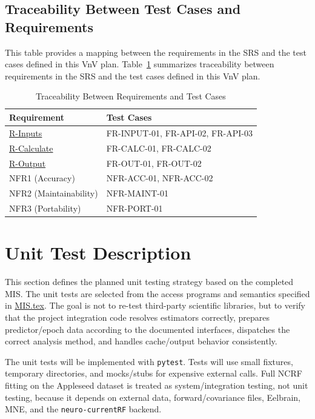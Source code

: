 \documentclass[12pt, titlepage]{article}
\begin{document}
\subsection{Traceability Between Test Cases and Requirements}

This table provides a mapping between the requirements in the SRS and the test cases defined in this VnV plan.
Table~\ref{tab:traceability} summarizes traceability between requirements in the
SRS and the test cases defined in this VnV plan.

\begin{table}[h!]
\centering
\begin{tabularx}{\textwidth}{p{} X}
\toprule
\textbf{Requirement} & \textbf{Test Cases} \\
\midrule
\hyperref[R-Inputs]{R-Inputs}  & FR-INPUT-01, FR-API-02, FR-API-03 \\
\hyperref[R-Calculate]{R-Calculate} & FR-CALC-01, FR-CALC-02 \\
\hyperref[R-Output]{R-Output} & FR-OUT-01, FR-OUT-02 \\
NFR1 (Accuracy) & NFR-ACC-01, NFR-ACC-02 \\
NFR2 (Maintainability) & NFR-MAINT-01 \\
NFR3 (Portability) & NFR-PORT-01 \\
\bottomrule
\end{tabularx}
\caption{Traceability Between Requirements and Test Cases}
\label{tab:traceability}
\end{table}


\section{Unit Test Description}

This section defines the planned unit testing strategy based on the completed MIS. The unit tests are selected from the access programs and semantics specified in \href{../Design/SoftDetailedDes/MIS.tex}{MIS.tex}. The goal is not to re-test third-party scientific libraries, but to verify that the project integration code resolves estimators correctly, prepares predictor/epoch data according to the documented interfaces, dispatches the correct analysis method, and handles cache/output behavior consistently.

The unit tests will be implemented with \texttt{pytest}. Tests will use small fixtures, temporary directories, and mocks/stubs for expensive external calls. Full NCRF fitting on the Appleseed dataset is treated as system/integration testing, not unit testing, because it depends on external data, forward/covariance files, Eelbrain, MNE, and the \texttt{neuro-currentRF} backend.
\end{document}
